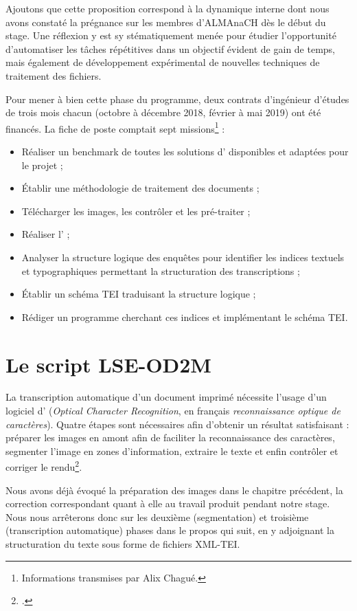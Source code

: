 Ajoutons que cette proposition correspond à la dynamique interne dont nous avons constaté la prégnance sur les membres d'ALMAnaCH dès le début du stage. Une réflexion y est sy
stématiquement menée pour étudier l'opportunité d'automatiser les tâches répétitives dans un objectif évident de gain de temps, mais également de développement expérimental de nouvelles techniques de traitement des fichiers.

Pour mener à bien cette phase du programme, deux contrats d'ingénieur d'études de trois mois chacun (octobre à décembre 2018, février à mai 2019) ont été financés. La fiche de poste comptait sept missions\footnote{Informations transmises par Alix Chagué.} :

\begin{itemize}
    \item Réaliser un benchmark de toutes les solutions d'\ocr{} disponibles et adaptées pour le projet ;
    \item Établir une méthodologie de traitement des documents ;
    \item Télécharger les images, les contrôler et les pré-traiter ;
    \item Réaliser l'\ocr{} ;
    \item Analyser la structure logique des enquêtes pour identifier les indices textuels et typographiques permettant la structuration des transcriptions ;
    \item Établir un schéma TEI traduisant la structure logique ;
    \item Rédiger un programme cherchant ces indices et implémentant le schéma TEI.
\end{itemize}

\section{Le script \textsc{LSE-OD2M}}

La transcription automatique d'un document imprimé nécessite l'usage d'un logiciel d'\ocr{} (\textit{Optical Character Recognition}, en français \textit{reconnaissance optique de caractères}). Quatre étapes sont nécessaires afin d'obtenir un résultat satisfaisant : préparer les images en amont afin de faciliter la reconnaissance des caractères, segmenter l'image en zones d'information, extraire le texte et enfin contrôler et corriger le rendu\footcite[p. 1]{karpinski}.

Nous avons déjà évoqué la préparation des images dans le chapitre précédent, la correction correspondant quant à elle au travail produit pendant notre stage. Nous nous arrêterons donc sur les deuxième (segmentation) et troisième (transcription automatique) phases dans le propos qui suit, en y adjoignant la structuration du texte sous forme de fichiers XML-TEI.

